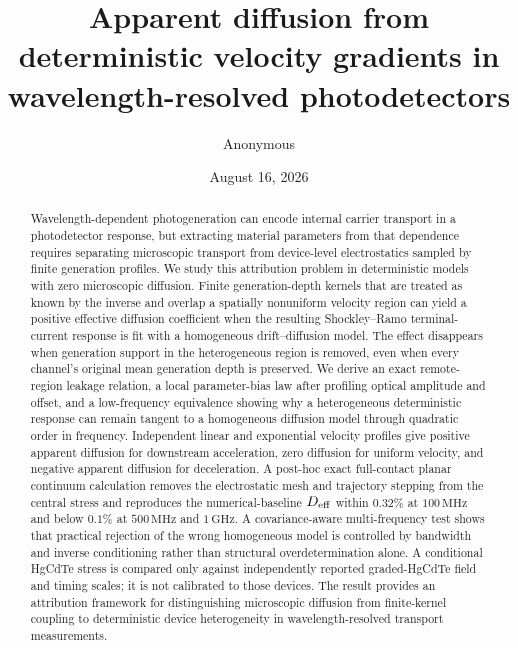 \documentclass[aps,pra,twocolumn,superscriptaddress,nofootinbib]{revtex4-2}
\begin{document}
\title{Apparent diffusion from deterministic velocity gradients in wavelength-resolved photodetectors}

\author{Anonymous}

\date{August 16, 2026}

\begin{abstract}
Wavelength-dependent photogeneration can encode internal carrier transport in a photodetector response, but extracting material parameters from that dependence requires separating microscopic transport from device-level electrostatics sampled by finite generation profiles. We study this attribution problem in deterministic models with zero microscopic diffusion. Finite generation-depth kernels that are treated as known by the inverse and overlap a spatially nonuniform velocity region can yield a positive effective diffusion coefficient when the resulting Shockley--Ramo terminal-current response is fit with a homogeneous drift--diffusion model. The effect disappears when generation support in the heterogeneous region is removed, even when every channel's original mean generation depth is preserved. We derive an exact remote-region leakage relation, a local parameter-bias law after profiling optical amplitude and offset, and a low-frequency equivalence showing why a heterogeneous deterministic response can remain tangent to a homogeneous diffusion model through quadratic order in frequency. Independent linear and exponential velocity profiles give positive apparent diffusion for downstream acceleration, zero diffusion for uniform velocity, and negative apparent diffusion for deceleration. A post-hoc exact full-contact planar continuum calculation removes the electrostatic mesh and trajectory stepping from the central stress and reproduces the numerical-baseline $D_{\rm eff}$ within $0.32\%$ at $100\,\mathrm{MHz}$ and below $0.1\%$ at $500\,\mathrm{MHz}$ and $1\,\mathrm{GHz}$. A covariance-aware multi-frequency test shows that practical rejection of the wrong homogeneous model is controlled by bandwidth and inverse conditioning rather than structural overdetermination alone. A conditional HgCdTe stress is compared only against independently reported graded-HgCdTe field and timing scales; it is not calibrated to those devices. The result provides an attribution framework for distinguishing microscopic diffusion from finite-kernel coupling to deterministic device heterogeneity in wavelength-resolved transport measurements.
\end{abstract}

\maketitle
\end{document}
